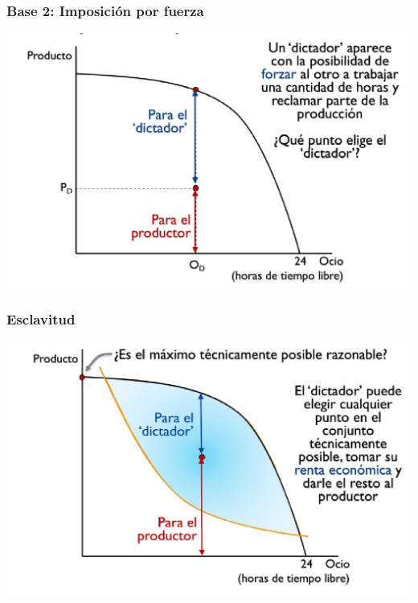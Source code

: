\documentclass{beamer}
\begin{document}
\begin{frame}
\frametitle{ Base 2: Imposición por fuerza}
\centering
\includegraphics[scale=0.4]{Figures/Tema_04.7_modcap4_2.jpg}\end{frame}

\begin{frame}
\frametitle{ Esclavitud}
\centering
\includegraphics[scale=0.4]{Figures/Tema_04.8_modcap4_3.jpg}
\end{frame}
\end{document}
